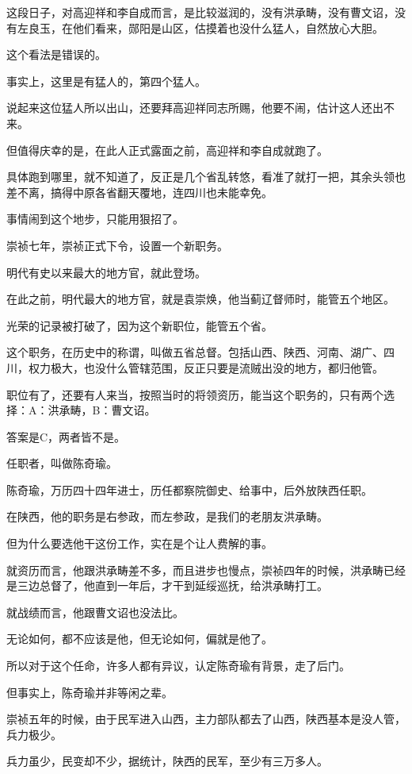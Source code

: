 \begin{multicols}{\theparacolNo}
这段日子，对高迎祥和李自成而言，是比较滋润的，没有洪承畴，没有曹文诏，没有左良玉，在他们看来，郧阳是山区，估摸着也没什么猛人，自然放心大胆。

这个看法是错误的。

事实上，这里是有猛人的，第四个猛人。

说起来这位猛人所以出山，还要拜高迎祥同志所赐，他要不闹，估计这人还出不来。

但值得庆幸的是，在此人正式露面之前，高迎祥和李自成就跑了。

具体跑到哪里，就不知道了，反正是几个省乱转悠，看准了就打一把，其余头领也差不离，搞得中原各省翻天覆地，连四川也未能幸免。

事情闹到这个地步，只能用狠招了。

崇祯七年，崇祯正式下令，设置一个新职务。

明代有史以来最大的地方官，就此登场。

在此之前，明代最大的地方官，就是袁崇焕，他当蓟辽督师时，能管五个地区。

光荣的记录被打破了，因为这个新职位，能管五个省。

这个职务，在历史中的称谓，叫做五省总督。包括山西、陕西、河南、湖广、四川，权力极大，也没什么管辖范围，反正只要是流贼出没的地方，都归他管。

职位有了，还要有人来当，按照当时的将领资历，能当这个职务的，只有两个选择：A：洪承畴，B：曹文诏。

答案是C，两者皆不是。

任职者，叫做陈奇瑜。

陈奇瑜，万历四十四年进士，历任都察院御史、给事中，后外放陕西任职。

在陕西，他的职务是右参政，而左参政，是我们的老朋友洪承畴。

但为什么要选他干这份工作，实在是个让人费解的事。

就资历而言，他跟洪承畴差不多，而且进步也慢点，崇祯四年的时候，洪承畴已经是三边总督了，他直到一年后，才干到延绥巡抚，给洪承畴打工。

就战绩而言，他跟曹文诏也没法比。

无论如何，都不应该是他，但无论如何，偏就是他了。

所以对于这个任命，许多人都有异议，认定陈奇瑜有背景，走了后门。

但事实上，陈奇瑜并非等闲之辈。

崇祯五年的时候，由于民军进入山西，主力部队都去了山西，陕西基本是没人管，兵力极少。

兵力虽少，民变却不少，据统计，陕西的民军，至少有三万多人。


\end{multicols}
